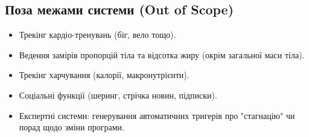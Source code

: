 \documentclass[12pt]{article}
\begin{document}
\subsection{Поза межами системи (Out of Scope)}
\begin{itemize}
    \item Трекінг кардіо-тренувань (біг, вело тощо).
    \item Ведення замірів пропорцій тіла та відсотка жиру (окрім загальної маси тіла).
    \item Трекінг харчування (калорії, макронутрієнти).
    \item Соціальні функції (шеринг, стрічка новин, підписки).
    \item Експертні системи: генерування автоматичних тригерів про "стагнацію" чи порад щодо зміни програми.
\end{itemize}
\end{document}
